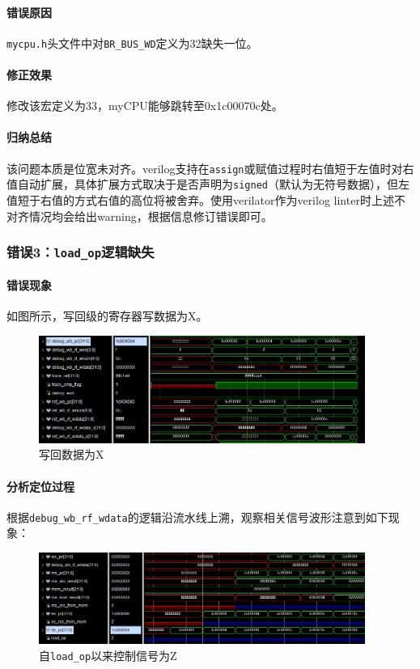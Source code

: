 \documentclass[UTF-8,twoside,c5size]{ctexart}
\begin{document}
	\paragraph{错误原因}\hfill
	
	\texttt{mycpu.h}头文件中对\texttt{BR\_BUS\_WD}定义为32缺失一位。
	\paragraph{修正效果}\hfill
	
	修改该宏定义为33，myCPU能够跳转至0x1c00070c处。
	\paragraph{归纳总结}\hfill
	
	该问题本质是位宽未对齐。verilog支持在\texttt{assign}或赋值过程时右值短于左值时对右值自动扩展，具体扩展方式取决于是否声明为\texttt{signed}（默认为无符号数据），但左值短于右值的方式右值的高位将被舍弃。使用verilator作为verilog linter时上述不对齐情况均会给出warning，根据信息修订错误即可。
	
	\subsubsection{错误\textbf{3：}\texttt{load\_op}逻辑缺失}
	\paragraph{错误现象}\hfill
	
	如图所示，写回级的寄存器写数据为X。
	
	\begin{figure}[!h]
		\centering
		\includegraphics*[width=0.95\textwidth]{03-dbg-03.jpg}
		\caption{写回数据为X}
	\end{figure}
	
	\paragraph{分析定位过程}\hfill
	
	根据\texttt{debug\_wb\_rf\_wdata}的逻辑沿流水线上溯，观察相关信号波形注意到如下现象：
	\begin{figure}[!h]
		\centering
		\includegraphics*[width=0.95\textwidth]{03-dbg-03-02.jpg}
		\caption{自\texttt{load\_op}以来控制信号为Z}
	\end{figure}
	
\end{document}
